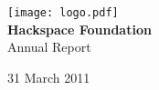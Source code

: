 


\begin{titlepage}
\begin{center}
\texttt{[image: logo.pdf]}\\[48pt]
{\bf \LARGE Hackspace Foundation}\\[36pt]
{\Large Annual Report}

\vfill
31 March 2011

\end{center}
\end{titlepage}







